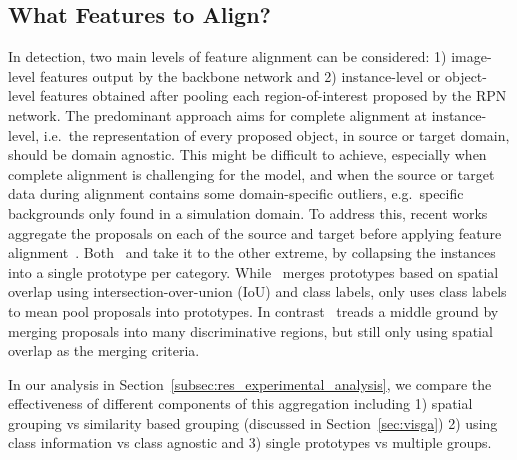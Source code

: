 \documentclass[10pt,twocolumn,letterpaper]{article}
\DeclareRobustCommand{\secref}[1]{Section~\ref{#1}}
\begin{document}
\subsection{What Features to Align?}
\label{subsec:feature_levels}
In detection, two main levels of feature alignment can be considered: 1)  image-level features output by the backbone network and 2)  instance-level or object-level features obtained after pooling each region-of-interest proposed by the RPN network. 
The predominant approach aims for complete alignment at instance-level, i.e.\ the representation of every proposed object, in source or target domain, should be domain agnostic. 
This might be difficult to achieve, especially when complete alignment is challenging for the model, and when the source or target data during alignment contains some domain-specific outliers, e.g.\ specific backgrounds only found in a simulation domain. 
To address this, recent works aggregate the proposals on each of the source and target before applying feature alignment~\cite{GPA, zheng_cvpr20_prototype, zhu_cvpr19_selective_alignment}.
Both~\cite{GPA} and \cite{zheng_cvpr20_prototype} take it to the other extreme, by collapsing the instances into a single prototype per category.
While~\cite{GPA} merges prototypes based on spatial overlap using intersection-over-union (IoU) and class labels, \cite{zheng_cvpr20_prototype} only uses class labels to mean pool proposals into prototypes.
In contrast~\cite{zhu_cvpr19_selective_alignment} treads a middle ground by merging proposals into many discriminative regions, but still only using spatial overlap as the merging criteria.

In our analysis in \secref{subsec:res_experimental_analysis}, we compare the effectiveness of different components of this aggregation including 1) spatial grouping vs similarity based grouping (discussed in \secref{sec:visga}) 2) using class information vs class agnostic and 3) single prototypes vs multiple groups.
\end{document}
